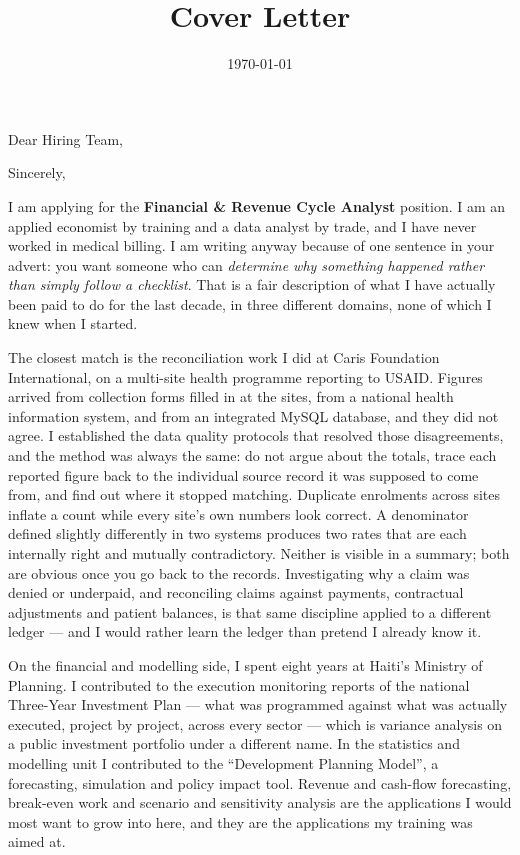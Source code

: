 \documentclass[10pt,a4paper,sans]{moderncv}
\title{Cover Letter}
\begin{document}
\date{\today}
\opening{Dear Hiring Team,}
\closing{Sincerely,}

\makelettertitle

I am applying for the \textbf{Financial \& Revenue Cycle Analyst} position. I am an applied economist by training and a data analyst by trade, and I have never worked in medical billing. I am writing anyway because of one sentence in your advert: you want someone who can \textit{determine why something happened rather than simply follow a checklist}. That is a fair description of what I have actually been paid to do for the last decade, in three different domains, none of which I knew when I started.

The closest match is the reconciliation work I did at Caris Foundation International, on a multi-site health programme reporting to USAID. Figures arrived from collection forms filled in at the sites, from a national health information system, and from an integrated MySQL database, and they did not agree. I established the data quality protocols that resolved those disagreements, and the method was always the same: do not argue about the totals, trace each reported figure back to the individual source record it was supposed to come from, and find out where it stopped matching. Duplicate enrolments across sites inflate a count while every site's own numbers look correct. A denominator defined slightly differently in two systems produces two rates that are each internally right and mutually contradictory. Neither is visible in a summary; both are obvious once you go back to the records. Investigating why a claim was denied or underpaid, and reconciling claims against payments, contractual adjustments and patient balances, is that same discipline applied to a different ledger --- and I would rather learn the ledger than pretend I already know it.

On the financial and modelling side, I spent eight years at Haiti's Ministry of Planning. I contributed to the execution monitoring reports of the national Three-Year Investment Plan --- what was programmed against what was actually executed, project by project, across every sector --- which is variance analysis on a public investment portfolio under a different name. In the statistics and modelling unit I contributed to the ``Development Planning Model'', a forecasting, simulation and policy impact tool. Revenue and cash-flow forecasting, break-even work and scenario and sensitivity analysis are the applications I would most want to grow into here, and they are the applications my training was aimed at.
\end{document}
